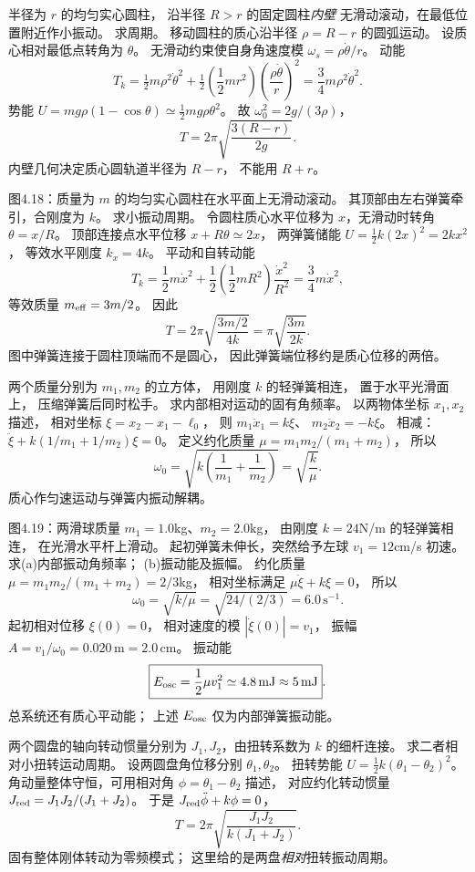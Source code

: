 半径为 $r$ 的均匀实心圆柱，
沿半径 $R>r$ 的固定圆柱\emph{内壁}
无滑动滚动，在最低位置附近作小振动。
求周期。
\exsolution
移动圆柱的质心沿半径
$\rho=R-r$ 的圆弧运动。
设质心相对最低点转角为 $\theta$。
无滑动约束使自身角速度模
$\omega_s=\rho\dot\theta/r$。
动能
\[
T_k=\tfrac12m\rho^2\dot\theta^2+
\tfrac12\left(\frac12mr^2\right)
\left(\frac{\rho\dot\theta}{r}\right)^2
=\frac34m\rho^2\dot\theta^2.
\]
势能
$U=mg\rho(1-\cos\theta)
\simeq\tfrac12mg\rho\theta^2$。
故
$\omega_0^2=2g/(3\rho)$，
\[
\boxed{T=2\pi\sqrt{\frac{3(R-r)}{2g}}}.
\]
\excheck 内壁几何决定质心圆轨道半径为 $R-r$，
不能用 $R+r$。

图4.18：质量为 $m$ 的均匀实心圆柱在水平面上无滑动滚动。
其顶部由左右弹簧牵引，合刚度为 $k$。
求小振动周期。
\exsolution
令圆柱质心水平位移为 $x$，无滑动时转角
$\theta=x/R$。
顶部连接点水平位移
$x+R\theta\simeq2x$，
两弹簧储能
$U=\tfrac12k(2x)^2=2kx^2$，
等效水平刚度 $k_x=4k$。
平动和自转动能
\[
T_k=\frac12m\dot x^2+
\frac12\left(\frac12mR^2\right)
\frac{\dot x^2}{R^2}
=\frac34m\dot x^2,
\]
等效质量 $m_{\rm eff}=3m/2$。
因此
\[
\boxed{T=2\pi\sqrt{\frac{3m/2}{4k}}
=\pi\sqrt{\frac{3m}{2k}}}.
\]
\excheck 图中弹簧连接于圆柱顶端而不是圆心，
因此弹簧端位移约是质心位移的两倍。

两个质量分别为 $m_1,m_2$ 的立方体，
用刚度 $k$ 的轻弹簧相连，
置于水平光滑面上，
压缩弹簧后同时松手。
求内部相对运动的固有角频率。
\exsolution
以两物体坐标 $x_1,x_2$ 描述，
相对坐标
$\xi=x_2-x_1-\ell_0$，
则
$m_1\ddot x_1=k\xi$、
$m_2\ddot x_2=-k\xi$。
相减：
$\ddot\xi+k(1/m_1+1/m_2)\xi=0$。
定义约化质量
$\mu=m_1m_2/(m_1+m_2)$，
所以
\[
\boxed{\omega_0=\sqrt{k\left(\frac1{m_1}+
\frac1{m_2}\right)}=\sqrt{\frac k\mu}}.
\]
\excheck 质心作匀速运动与弹簧内振动解耦。

图4.19：两滑球质量
$m_1=1.0$kg、$m_2=2.0$kg，
由刚度 $k=24$N/m 的轻弹簧相连，
在光滑水平杆上滑动。
起初弹簧未伸长，突然给予左球
$v_1=12$cm/s 初速。
求(a)内部振动角频率；
(b)振动能及振幅。
\exsolution
约化质量
$\mu=m_1m_2/(m_1+m_2)=2/3$kg，
相对坐标满足
$\mu\ddot\xi+k\xi=0$，
所以
\[
\boxed{\omega_0=\sqrt{k/\mu}
=\sqrt{24/(2/3)}=6.0\,\mathrm{s^{-1}}}.
\]
起初相对位移 $\xi(0)=0$，
相对速度的模 $|\dot\xi(0)|=v_1$，
振幅
$\boxed{A=v_1/\omega_0=0.020\,\mathrm m=2.0\,\mathrm{cm}}$。
振动能
\[
\boxed{E_{\rm osc}=\frac12\mu v_1^2
\simeq4.8\,\mathrm{mJ}\approx5\,\mathrm{mJ}}.
\]
\excheck 总系统还有质心平动能；
上述 $E_{\rm osc}$ 仅为内部弹簧振动能。

两个圆盘的轴向转动惯量分别为
$J_1,J_2$，由扭转系数为 $k$ 的细杆连接。
求二者相对小扭转运动周期。
\exsolution
设两圆盘角位移分别
$\theta_1,\theta_2$。
扭转势能
$U=\tfrac12k(\theta_1-\theta_2)^2$。
角动量整体守恒，可用相对角
$\phi=\theta_1-\theta_2$ 描述，
对应约化转动惯量
$J_{\rm red}=J_1J_2/(J_1+J_2)$。
于是
$J_{\rm red}\ddot\phi+k\phi=0$，
\[
\boxed{T=2\pi\sqrt{\frac{J_1J_2}{k(J_1+J_2)}}}.
\]
\excheck 固有整体刚体转动为零频模式；
这里给的是两盘\emph{相对}扭转振动周期。

